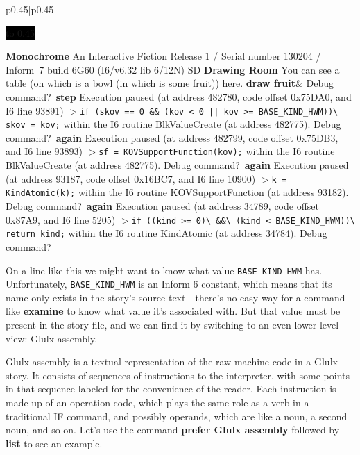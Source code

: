 \documentclass{book}
\newcommand{\n}{\hspace*{\fill}\newline}
\newcommand{\terp}[2]{\begin{center}\begin{tabular}{p{0.45\textwidth}|p{0.45\textwidth}}\midrule #1&#2\\\midrule\end{tabular}\end{center}}
\newcommand{\glkheading}[1]{\textbf{#1}}
\newcommand{\glkinput}[1]{\textbf{#1}}
\newcommand{\glkstatusline}[2]{\centerline{\colorbox{black}{\hbox to 0.45\textwidth{\textcolor{white}{#1\hfil #2}}}}}
\newcommand{\storyprompt}{\raisebox{1.5pt}{\(>\)}}
\newcommand{\cursor}{\raisebox{-1.5pt}{\RectangleThin}}
\newcommand{\markedindent}{\(>\)\qquad}
\begin{document}
\terp{\glkstatusline{Drawing Room}{0/1}\n
  \glkheading{Monochrome}\n
  An Interactive Fiction\n
  Release 1 / Serial number 130204 / Inform~7 build 6G60 (I6/v6.32 lib 6/12N) SD\n
  \n
  \glkheading{Drawing Room}\n
  You can see a table (on which is a bowl (in which is some fruit)) here.\n
  \n
  \storyprompt\glkinput{draw fruit}}{%
  Debug command?\ \glkinput{step}\n
  \n
  Execution paused (at address 482780, code offset 0x75DA0, and I6 line 93891)\n
  \markedindent \lstinline{if (skov == 0 && (kov < 0 || kov >= BASE_KIND_HWM))}\lstinline{\ skov = kov;}\n
  within the I6 routine BlkValueCreate (at address 482775).\n
  \n
  Debug command?\ \glkinput{again}\n
  \n
  Execution paused (at address 482799, code offset 0x75DB3, and I6 line 93893)\n
  \markedindent \lstinline{sf = KOVSupportFunction(kov);}\n
  within the I6 routine BlkValueCreate (at address 482775).\n
  \n
  Debug command?\ \glkinput{again}\n
  \n
  Execution paused (at address 93187, code offset 0x16BC7, and I6 line 10900)\n
  \markedindent \lstinline{k = KindAtomic(k);}\n
  within the I6 routine KOVSupportFunction (at address 93182).\n
  \n
  Debug command?\ \glkinput{again}\n
  \n
  Execution paused (at address 34789, code offset 0x87A9, and I6 line 5205)\n
  \markedindent \lstinline{if ((kind >= 0)}\lstinline{\ &&}\lstinline{\ (kind < BASE_KIND_HWM))}\lstinline{\ return kind;}\n
  within the I6 routine KindAtomic (at address 34784).\n
  \n
  Debug command?\ \cursor}

On a line like this we might want to know what value \lstinline{BASE_KIND_HWM}
has.  Unfortunately, \lstinline{BASE_KIND_HWM} is an Inform 6 constant, which
means that its name only exists in the story's source text---there's no easy way
for a command like \glkinput{examine} to know what value it's associated with.
But that value must be present in the story file, and we can find it by
switching to an even lower-level view: Glulx assembly.

\label{glulx-format}
Glulx assembly is a textual representation of the raw machine code in a Glulx
story.  It consists of sequences of instructions to the interpreter, with some
points in that sequence labeled for the convenience of the reader.  Each
instruction is made up of an operation code, which plays the same role as a verb
in a traditional IF command, and possibly operands, which are like a noun, a
second noun, and so on.  Let's use the command \glkinput{prefer Glulx assembly}
followed by \glkinput{list} to see an example.
\end{document}
